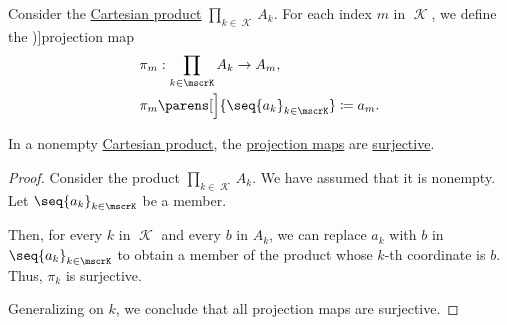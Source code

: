 \begin{definition}\label{def:cartesian_product_projection}
  Consider the \hyperref[def:cartesian_product]{Cartesian product} \( \prod_{k \in \mscrK} A_k \). For each index \( m \) in \( \mscrK \), we define the \term[ru=оператор проектирования, en=projection (\cite[36]{Halmos1960NaiveSetTheory})]{projection map}
  \begin{equation}\label{eq:def:cartesian_product_projection}
    \begin{aligned}
      &\pi_m: \prod_{k \in \mscrK} A_k \to A_m, \\
      &\pi_m\parens[\Big]{ \seq{ a_k }_{k \in \mscrK} } \coloneqq a_m.
    \end{aligned}
  \end{equation}
\end{definition}

\begin{proposition}\label{thm:cartesian_product_projection_surjective}
  In a nonempty \hyperref[def:cartesian_product]{Cartesian product}, the \hyperref[def:cartesian_product_projection]{projection maps} are \hyperref[def:function_invertibility/surjective]{surjective}.
\end{proposition}
\begin{proof}
  Consider the product \( \prod_{k \in \mscrK} A_k \). We have assumed that it is nonempty. Let \( \seq{ a_k }_{k \in \mscrK} \) be a member.

  Then, for every \( k \) in \( \mscrK \) and every \( b \) in \( A_k \), we can replace \( a_k \) with \( b \) in \( \seq{ a_k }_{k \in \mscrK} \) to obtain a member of the product whose \( k \)-th coordinate is \( b \). Thus, \( \pi_k \) is surjective.

  Generalizing on \( k \), we conclude that all projection maps are surjective.
\end{proof}

